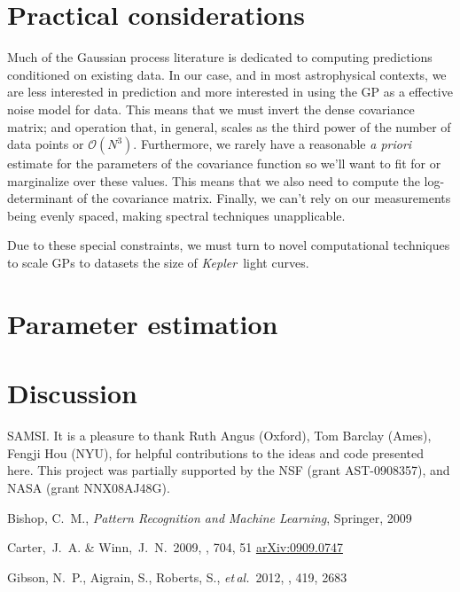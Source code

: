 \documentclass[12pt,preprint]{aastex}
\newcommand{\project}[1]{{\emph{#1}}}
\newcommand{\kepler}{\project{Kepler}}
\newcommand{\foreign}[1]{\emph{#1}}
\newcommand{\etal}{\foreign{et\,al.}}
\newcommand{\sectlabel}[1]{\label{sect:#1}}
\begin{document}
\section{Practical considerations}\sectlabel{practical}

Much of the Gaussian process literature is dedicated to computing predictions
conditioned on existing data.
In our case, and in most astrophysical contexts, we are less interested in
prediction and more interested in using the GP as a effective noise model for
data.
This means that we must invert the dense covariance matrix; and operation
that, in general, scales as the third power of the number of data points or
$\mathcal{O}(N^3)$.
Furthermore, we rarely have a reasonable \foreign{a priori} estimate for the
parameters of the covariance function so we'll want to fit for or marginalize
over these values.
This means that we also need to compute the log-determinant of the covariance
matrix.
Finally, we can't rely on our measurements being evenly spaced, making
spectral techniques unapplicable.

Due to these special constraints, we must turn to novel computational
techniques to scale GPs to datasets the size of \kepler\ light curves.


\section{Parameter estimation}\sectlabel{parameters}

\section{Discussion}\sectlabel{discussion}

\acknowledgments
SAMSI. %
It is a pleasure to thank
    Ruth Angus (Oxford),
    Tom Barclay (Ames),
    Fengji Hou (NYU),
for helpful contributions to the ideas and code presented here.
This project was partially supported by the NSF (grant AST-0908357), and NASA
(grant NNX08AJ48G).

\newcommand{\arxiv}[1]{\href{http://arxiv.org/abs/#1}{arXiv:#1}}
\begin{thebibliography}{}\raggedright

Bishop, C.~M., \emph{Pattern Recognition and Machine Learning}, Springer, 2009

Carter,~J.~A. \& Winn,~J.~N.\ 2009, \apj, 704, 51
\arxiv{0909.0747}

\bibitem[Gibson \etal(2012)]{gibson-gp}
Gibson, N.~P., Aigrain, S., Roberts, S., \etal\ 2012, \mnras, 419, 2683

\end{thebibliography}
\end{document}
